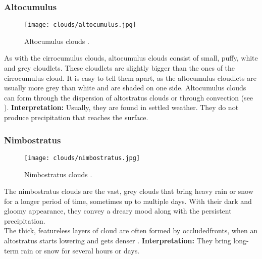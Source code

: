 \subsubsection{Altocumulus}
\begin{wrapfigure}[9]{r}{6.3cm}
    \vspace{-\baselineskip}
    \texttt{[image: clouds/altocumulus.jpg]}
    \caption{Altocumulus clouds \protect\cite{cloudtypes:wiki:altocumulus}.}
    \label{img:clouds:altocumulus}
\end{wrapfigure}
As with the cirrocumulus clouds, altocumulus clouds consist of small, puffy, white and grey \gls{cloudlet}s.
These \gls{cloudlet}s are slightly bigger than the ones of the cirrocumulus cloud.
It is easy to tell them apart, as the altocumulus \gls{cloudlet}s are usually more grey than white and are shaded on one side.
Altocumulus clouds can form through the dispersion of altostratus clouds or through \gls{convection} (see ).
\emptyline
\textbf{Interpretation:}
Usually, they are found in settled weather. They do not produce \gls{precipitation} that reaches the surface.


\subsubsection{Nimbostratus}
\begin{wrapfigure}[10]{r}{6.3cm}
    \vspace{-\baselineskip}
    \texttt{[image: clouds/nimbostratus.jpg]}
    \caption{Nimbostratus clouds \protect\cite{cloudtypes:meteoblue}.}
    \label{img:clouds:nimbostratus}
\end{wrapfigure}
The nimbostratus clouds are the vast, grey clouds that bring heavy rain or snow for a longer period of time, sometimes up to multiple days.
With their dark and gloomy appearance, they convey a dreary mood along with the persistent \gls{precipitation}.
\\
The thick, featureless layers of cloud are often formed by \gls{occludedfront}s, when an altostratus starts lowering and gets denser \cite{cloudtypes:wiki:nimbostratus}.
\emptyline
\textbf{Interpretation:}
They bring long-term rain or snow for several hours or days.

\pagebreak

